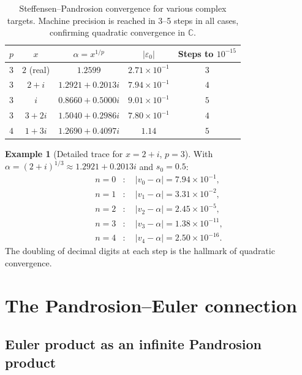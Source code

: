 \documentclass[11pt,a4paper]{article}
\theoremstyle{definition}
\newtheorem{example}{Example}[section]
\newcommand{\eps}{\varepsilon}
\newcommand{\CC}{\mathbb{C}}
\begin{document}
\begin{table}[h]
\centering
\begin{tabular}{ccccc}
\toprule
$p$ & $x$ & $\alpha = x^{1/p}$ & $|\eps_0|$ & Steps to $10^{-15}$ \\
\midrule
$3$ & $2$ (real) & $1.2599$ & $2.71 \times 10^{-1}$ & $3$ \\
$3$ & $2+i$ & $1.2921 + 0.2013i$ & $7.94 \times 10^{-1}$ & $4$ \\
$3$ & $i$ & $0.8660 + 0.5000i$ & $9.01 \times 10^{-1}$ & $5$ \\
$3$ & $3+2i$ & $1.5040 + 0.2986i$ & $7.80 \times 10^{-1}$ & $4$ \\
$4$ & $1+3i$ & $1.2690 + 0.4097i$ & $1.14$ & $5$ \\
\bottomrule
\end{tabular}
\caption{Steffensen--Pandrosion convergence for various complex targets.  Machine precision is reached in 3--5 steps in all cases, confirming quadratic convergence in $\CC$.}
\label{tab:steffensen_complex}
\end{table}

\begin{example}[Detailed trace for $x = 2+i$, $p = 3$]
With $\alpha = (2+i)^{1/3} \approx 1.2921 + 0.2013i$ and $s_0 = 0.5$:
\begin{align*}
  n=0&: \quad |v_0 - \alpha| = 7.94 \times 10^{-1}, \\
  n=1&: \quad |v_1 - \alpha| = 3.31 \times 10^{-2}, \\
  n=2&: \quad |v_2 - \alpha| = 2.45 \times 10^{-5}, \\
  n=3&: \quad |v_3 - \alpha| = 1.38 \times 10^{-11}, \\
  n=4&: \quad |v_4 - \alpha| = 2.50 \times 10^{-16}.
\end{align*}
The doubling of decimal digits at each step is the hallmark of quadratic convergence.
\end{example}

\section{The Pandrosion--Euler connection}
\label{sec:euler}

\subsection{Euler product as an infinite Pandrosion product}
\end{document}
